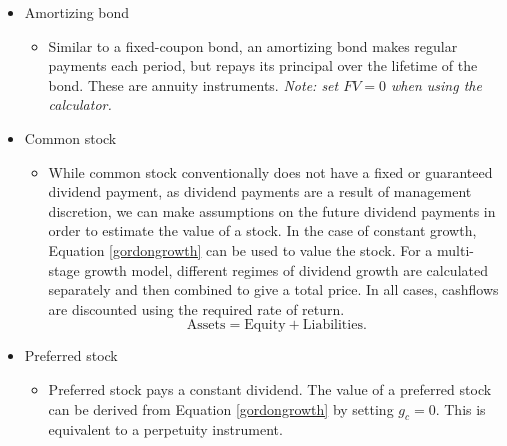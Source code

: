 \documentclass[../notes_compiled.tex]{subfiles}
\begin{document}
\begin{itemize}
\begin{itemize}
\begin{table}[H]
\begin{tblr}{colspec = {lc}}
$\text{Coupon} > \text{Yield}$ & Trade above par (premium) \\ \hline[1.25pt]
\end{tblr}
\caption{Relationships between coupon and yield, and the trading price of fixed income instruments}
\end{table}
\vspace{-.5cm}
\begin{equation}
\text{Price} = \underbrace{\text{Coupon} \times \frac{1}{\text{Yield}} \left[1-\frac{1}{(1+\text{Yield})^{n}}\right]}_{\text{Same as annuity}} + \frac{\text{notional}}{(1+\text{Yield})^{n}}.
\end{equation}
A perpetuity is an annuity with $n\rightarrow\infty$, which yields
\begin{equation}
\text{Price} = \frac{\text{Coupon}}{\text{Yield}}.
\end{equation}

\end{itemize}
\item[] Amortizing bond
\begin{itemize}
\item[] Similar to a fixed-coupon bond, an amortizing bond makes regular payments each period, but repays its principal over the lifetime of the bond. These are annuity instruments. \emph{Note: set $FV=0$ when using the calculator.}
\end{itemize}
\item[] Common stock
\begin{itemize}
\item[] While common stock conventionally does not have a fixed or guaranteed dividend payment, as dividend payments are a result of management discretion, we can make assumptions on the future dividend payments in order to estimate the value of a stock. In the case of constant growth, Equation \ref{gordongrowth} can be used to value the stock. For a multi-stage growth model, different regimes of dividend growth are calculated separately and then combined to give a total price. In all cases, cashflows are discounted using the required rate of return.
\begin{equation}
\text{Assets} = \text{Equity} + \text{Liabilities}.
\end{equation}
\end{itemize}
\item[] Preferred stock
\begin{itemize}
\item[] Preferred stock pays a constant dividend. The value of a preferred stock can be derived from Equation \ref{gordongrowth} by setting $g_{c}=0$. This is equivalent to a perpetuity instrument.
\end{itemize}
\end{itemize}
\end{document}
